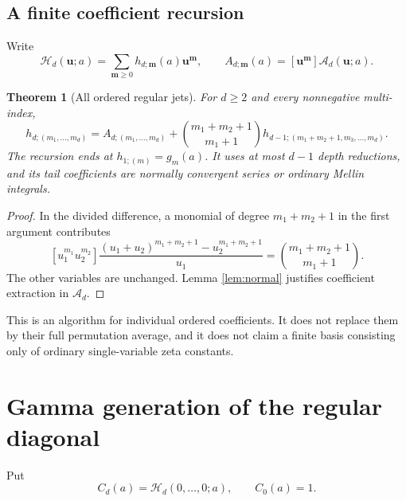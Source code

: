 \documentclass[11pt,a4paper]{article}
\numberwithin{equation}{section}
\newtheorem{theorem}{Theorem}[section]
\theoremstyle{definition}\newtheorem{definition}[theorem]{Definition}
\theoremstyle{remark}\newtheorem{remark}[theorem]{Remark}
\newcommand{\HH}{\mathcal H}
\newcommand{\Atail}{\mathcal A}
\begin{document}
\subsection{A finite coefficient recursion}
Write
\begin{equation}\label{eq:hcoeffdef}
 \HH_d(\bm u;a)=\sum_{\bm m\ge0}h_{d;\bm m}(a)\bm u^{\bm m},
 \qquad A_{d;\bm m}(a)=[\bm u^{\bm m}]\Atail_d(\bm u;a).
\end{equation}

\begin{theorem}[All ordered regular jets]\label{thm:coefficients}
For $d\ge2$ and every nonnegative multi-index,
\begin{equation}\label{eq:hrec}
 \boxed{\displaystyle
 h_{d;(m_1,\ldots,m_d)}
 =A_{d;(m_1,\ldots,m_d)}+
 \binom{m_1+m_2+1}{m_1+1}
 h_{d-1;(m_1+m_2+1,m_3,\ldots,m_d)}.}
\end{equation}
The recursion ends at $h_{1;(m)}=g_m(a)$. It uses at most $d-1$
depth reductions, and its tail coefficients are normally convergent
series or ordinary Mellin integrals.
\end{theorem}
\begin{proof}
In the divided difference, a monomial of degree
$m_1+m_2+1$ in the first argument contributes
\[
 [u_1^{m_1}u_2^{m_2}]
 \frac{(u_1+u_2)^{m_1+m_2+1}-u_2^{m_1+m_2+1}}{u_1}
 =\binom{m_1+m_2+1}{m_1+1}.
\]
The other variables are unchanged. Lemma \ref{lem:normal} justifies
coefficient extraction in $\Atail_d$.
\end{proof}

This is an algorithm for individual ordered coefficients. It does not
replace them by their full permutation average, and it does not claim a
finite basis consisting only of ordinary single-variable zeta constants.

\section{Gamma generation of the regular diagonal}
\label{sec:gamma}

Put
\begin{equation}\label{eq:Cdef}
 C_d(a)=\HH_d(0,\ldots,0;a),\qquad C_0(a)=1.
\end{equation}
\end{document}
